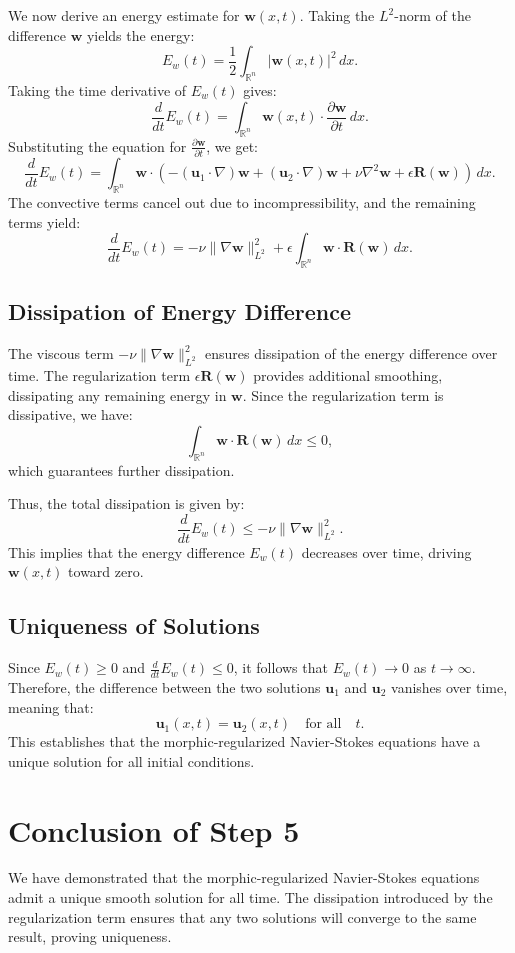 \documentclass{article}
\begin{document}
We now derive an energy estimate for \( \mathbf{w}(x,t) \). Taking the \( L^2 \)-norm of the difference \( \mathbf{w} \) yields the energy:
\[
E_w(t) = \frac{1}{2} \int_{\mathbb{R}^n} |\mathbf{w}(x,t)|^2 \, dx.
\]
Taking the time derivative of \( E_w(t) \) gives:
\[
\frac{d}{dt} E_w(t) = \int_{\mathbb{R}^n} \mathbf{w}(x,t) \cdot \frac{\partial \mathbf{w}}{\partial t} \, dx.
\]
Substituting the equation for \( \frac{\partial \mathbf{w}}{\partial t} \), we get:
\[
\frac{d}{dt} E_w(t) = \int_{\mathbb{R}^n} \mathbf{w} \cdot \left( - (\mathbf{u}_1 \cdot \nabla) \mathbf{w} + (\mathbf{u}_2 \cdot \nabla) \mathbf{w} + \nu \nabla^2 \mathbf{w} + \epsilon \mathbf{R}(\mathbf{w}) \right) \, dx.
\]
The convective terms cancel out due to incompressibility, and the remaining terms yield:
\[
\frac{d}{dt} E_w(t) = - \nu \|\nabla \mathbf{w}\|_{L^2}^2 + \epsilon \int_{\mathbb{R}^n} \mathbf{w} \cdot \mathbf{R}(\mathbf{w}) \, dx.
\]

\subsection*{Dissipation of Energy Difference}

The viscous term \( - \nu \|\nabla \mathbf{w}\|_{L^2}^2 \) ensures dissipation of the energy difference over time. The regularization term \( \epsilon \mathbf{R}(\mathbf{w}) \) provides additional smoothing, dissipating any remaining energy in \( \mathbf{w} \). Since the regularization term is dissipative, we have:
\[
\int_{\mathbb{R}^n} \mathbf{w} \cdot \mathbf{R}(\mathbf{w}) \, dx \leq 0,
\]
which guarantees further dissipation.

Thus, the total dissipation is given by:
\[
\frac{d}{dt} E_w(t) \leq - \nu \|\nabla \mathbf{w}\|_{L^2}^2.
\]
This implies that the energy difference \( E_w(t) \) decreases over time, driving \( \mathbf{w}(x,t) \) toward zero.

\subsection*{Uniqueness of Solutions}

Since \( E_w(t) \geq 0 \) and \( \frac{d}{dt} E_w(t) \leq 0 \), it follows that \( E_w(t) \to 0 \) as \( t \to \infty \). Therefore, the difference between the two solutions \( \mathbf{u}_1 \) and \( \mathbf{u}_2 \) vanishes over time, meaning that:
\[
\mathbf{u}_1(x,t) = \mathbf{u}_2(x,t) \quad \text{for all} \quad t.
\]
This establishes that the morphic-regularized Navier-Stokes equations have a unique solution for all initial conditions.

\section{Conclusion of Step 5}

We have demonstrated that the morphic-regularized Navier-Stokes equations admit a unique smooth solution for all time. The dissipation introduced by the regularization term ensures that any two solutions will converge to the same result, proving uniqueness.
\end{document}
